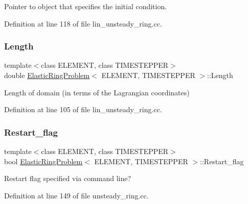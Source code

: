 Pointer to object that specifies the initial condition. 



Definition at line 118 of file lin\+\_\+unsteady\+\_\+ring.\+cc.

\mbox{\label{classElasticRingProblem_a74aac22a4e8673b1e58c024610f8220f}} 
\subsubsection{\texorpdfstring{Length}{Length}}
{\footnotesize\ttfamily template$<$class E\+L\+E\+M\+E\+NT, class T\+I\+M\+E\+S\+T\+E\+P\+P\+ER$>$ \\
double \hyperlink{classElasticRingProblem}{Elastic\+Ring\+Problem}$<$ E\+L\+E\+M\+E\+NT, T\+I\+M\+E\+S\+T\+E\+P\+P\+ER $>$\+::Length\hspace{0.3cm}{\ttfamily [private]}}



Length of domain (in terms of the Lagrangian coordinates) 



Definition at line 105 of file lin\+\_\+unsteady\+\_\+ring.\+cc.

\mbox{\label{classElasticRingProblem_a6be2bdf76434e5f69e105199e0ba3ab6}} 
\subsubsection{\texorpdfstring{Restart\+\_\+flag}{Restart\_flag}}
{\footnotesize\ttfamily template$<$class E\+L\+E\+M\+E\+NT, class T\+I\+M\+E\+S\+T\+E\+P\+P\+ER$>$ \\
bool \hyperlink{classElasticRingProblem}{Elastic\+Ring\+Problem}$<$ E\+L\+E\+M\+E\+NT, T\+I\+M\+E\+S\+T\+E\+P\+P\+ER $>$\+::Restart\+\_\+flag\hspace{0.3cm}{\ttfamily [private]}}



Restart flag specified via command line? 



Definition at line 149 of file unsteady\+\_\+ring.\+cc.

